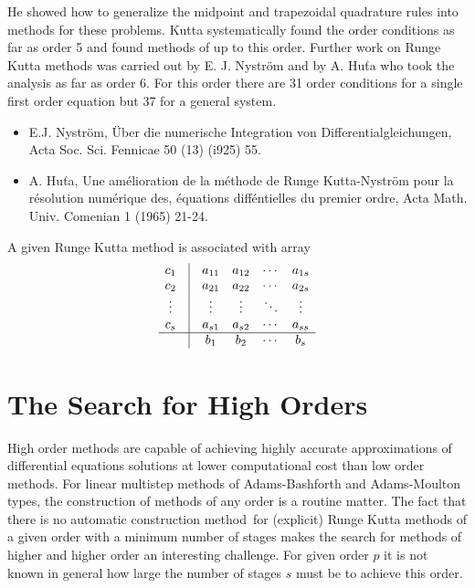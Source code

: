 \documentclass[a4paper,oneside]{book}
\numberwithin{equation}{chapter}
\begin{document}
He showed how to generalize the midpoint and trapezoidal quadrature rules into methods for these problems. Kutta systematically found the order conditions as far as order 5 and found methods of up to this order. Further work on Runge Kutta methods was carried out by E. J. Nystr\"{o}m and by A. Hu\v{t}a who took the analysis as far as order 6. For this order there are 31 order conditions for a single first order equation but 37 for a general system. 
\begin{itemize}
\item E.J. Nystr\"{o}m, \"{U}ber die numerische Integration von Differentialgleichungen, Acta Soc. Sci. Fennicae 50 (13) (i925) 55.
\item A. Hu\v{t}a, Une am\'{e}lioration de la m\'{e}thode de Runge Kutta-Nystr\"{o}m pour la r\'{e}solution num\'{e}rique des, \'{e}quations diff\'{e}ntielles du premier ordre, Acta Math. Univ. Comenian 1 (1965) 21-24.
\end{itemize}

A given Runge Kutta method is associated with array
\begin{align}
\begin{array}{*{20}{c}}
{{c_1}}&\vline& {{a_{11}}}&{{a_{12}}}& \cdots &{{a_{1s}}}\\
{{c_2}}&\vline& {{a_{21}}}&{{a_{22}}}& \cdots &{{a_{2s}}}\\
 \vdots &\vline&  \vdots & \vdots & \ddots & \vdots \\
{{c_s}}&\vline& {{a_{s1}}}&{{a_{s2}}}& \cdots &{{a_{ss}}}\\
\hline
{}&\vline& {{b_1}}&{{b_2}}& \cdots &{{b_s}}
\end{array}
\end{align}

\section{The Search for High Orders}
High order methods are capable of achieving highly accurate approximations of differential equations solutions at lower computational cost than low order methods. For linear multistep methods of Adams-Bashforth and Adams-Moulton types, the construction of methods of any order is a routine matter. The fact that there is no automatic construction method\ for (explicit) Runge Kutta methods of a given order with a minimum number of stages makes the search for methods of higher and higher order an interesting challenge. For given order $p$ it is not known in general how large the number of stages $s$ must be to achieve this order.
\end{document}
